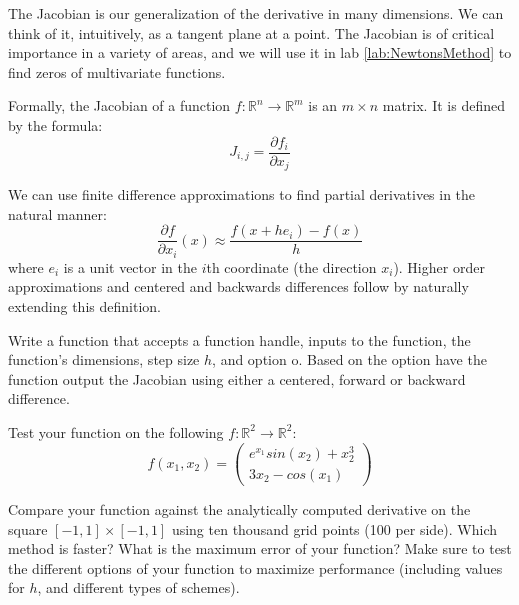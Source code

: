 \label{Ch:Multivariate Finite Difference Schemes}


The Jacobian is our generalization of the derivative in many dimensions. We can think of it, intuitively, as a tangent plane at a point. The Jacobian is of critical importance in a variety of areas, and we will use it in lab \ref{lab:NewtonsMethod} to find zeros of multivariate functions.

Formally, the Jacobian of a function $f:\mathbb{R}^n \rightarrow \mathbb{R}^m$ is an $m \times n$ matrix. It is defined by the formula:
\begin{equation*}
J_{i,j} = \frac{\partial f_i}{\partial x_j}
\end{equation*}

We can use finite difference approximations to find partial derivatives in the natural manner:
\begin{equation*}
\frac{\partial f}{\partial x_i} (x) \approx \frac{f(x+h e_i)-f(x)}{h}
\end{equation*}
where $e_i$ is a unit vector in the $i$th coordinate (the direction $x_i$). Higher order approximations and centered and backwards differences follow by naturally extending this definition.

\begin{problem}
Write a function  that accepts a function handle, inputs to the function, the function's dimensions, step size $h$, and option o. Based on the option have the function output the Jacobian using either a centered, forward or backward difference.

Test your function on the following $f: \mathbb{R}^2 \to \mathbb{R}^2$:
\begin{equation*}
f(x_1, x_2) = 
\begin{pmatrix}
e^{x_1} sin(x_2) + x_2^3 \\
3x_2 - cos(x_1)
\end{pmatrix}
\end{equation*} 

Compare your  function against the analytically computed derivative on the square $[-1,1] \times [-1,1]$ using ten thousand grid points (100 per side). Which method is faster? What is the maximum error of your function? Make sure to test the different options of your function to maximize performance (including values for $h$, and different types of schemes).
\end{problem}

